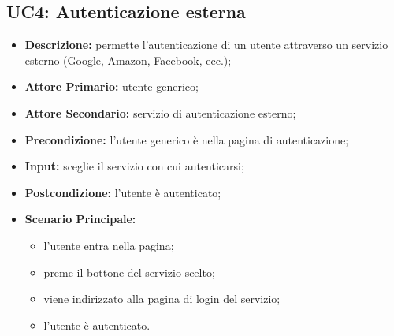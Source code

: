 \subsection{UC4: Autenticazione esterna}
\label{sec:UC4}
\begin{itemize}
    \item \textbf{Descrizione:} permette l'autenticazione di un utente attraverso un servizio esterno (Google, Amazon, Facebook, ecc.);
    \item \textbf{Attore Primario:} utente generico;
    \item \textbf{Attore Secondario:} servizio di autenticazione esterno;
    \item \textbf{Precondizione:} l'utente generico è nella pagina di autenticazione;
    \item \textbf{Input:} sceglie il servizio con cui autenticarsi;
    \item \textbf{Postcondizione:} l'utente è autenticato;
    \item \textbf{Scenario Principale:}
          \begin{itemize}
              \item l'utente entra nella pagina;
              \item preme il bottone del servizio scelto;
              \item viene indirizzato alla pagina di login del servizio;
              \item l'utente è autenticato.
          \end{itemize}
\end{itemize}